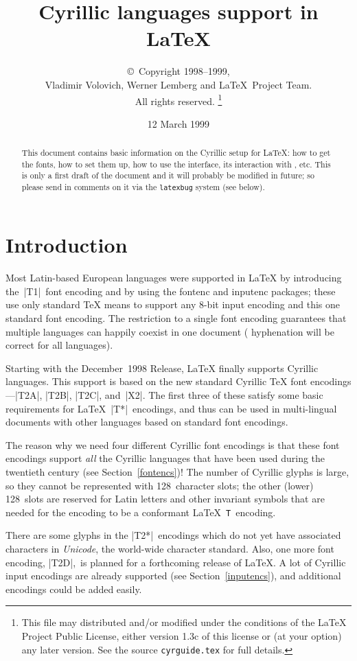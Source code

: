 \documentclass{ltxguide}[1999/02/28]
\title{Cyrillic languages support in \LaTeX}
\author{\copyright~Copyright 1998--1999,\\ Vladimir Volovich,
        Werner Lemberg and \LaTeX\ Project Team.\\ All rights reserved.%
        \footnote{This file may distributed and/or modified under the
          conditions of the \LaTeX{} Project Public License, either version 1.3c
          of this license or (at your option) any later version. See the source
         \texttt{cyrguide.tex} for full details.}%
}
\date{12 March 1999}
\begin{document}
\maketitle
\tableofcontents

\begin{abstract}
  This document contains basic information on the Cyrillic setup for
  \LaTeX{}: how to get the fonts, how to set them up, how to use
  the interface, its interaction with \babel{}, etc. This is only a first
  draft of the document and it will probably be modified in future; so
  please send in comments on it via the \texttt{latexbug} system
  (see below).
\end{abstract}


\section{Introduction}

Most Latin-based European languages were supported in \LaTeX{} by
introducing the~|T1|~font encoding and by using the \textsf{fontenc}
and \textsf{inputenc} packages; these use only standard \TeX{} means
to support any \mbox{8-bit} input encoding and this one standard font
encoding.  The restriction to a single font encoding guarantees that
multiple languages can happily coexist in one document (\eg
hyphenation will be correct for all languages).

Starting with the December~1998 Release, \LaTeX{} finally supports
Cyrillic languages.  This support is based on the new standard
Cyrillic \TeX{} font encodings---|T2A|, |T2B|, |T2C|, and~|X2|.  The
first three of these satisfy some basic requirements for
\LaTeX{}~|T*|~encodings, and thus can be used in multi-lingual documents
with other languages based on standard font encodings.

The reason why we need four different Cyrillic font encodings is that
these font encodings support \emph{all} the Cyrillic languages that
have been used during the twentieth century (see
Section~\ref{fontencs})!  The number of Cyrillic glyphs is large, so
they cannot be represented with 128~character slots; the other (lower)
128~slots are reserved for Latin letters and other invariant symbols
that are needed for the encoding to be a conformant
\LaTeX{}~\texttt{T}~encoding.

There are some glyphs in the |T2*|~encodings which do not yet have
associated characters in \emph{Unicode}, the world-wide character
standard.  Also, one more font encoding, |T2D|,~is planned for a
forthcoming release of \LaTeX{}.  A lot of Cyrillic input encodings
are already supported (see Section~\ref{inputencs}), and additional
encodings could be added easily.
\end{document}
